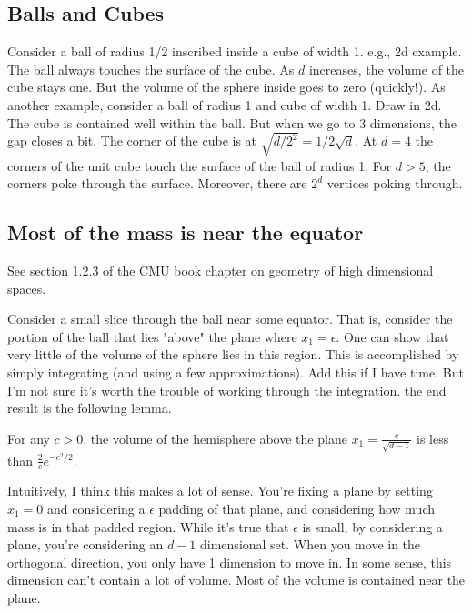 


\subsection{Balls and Cubes}
Consider a ball of radius 1/2 inscribed inside a cube of width 1. e.g., 2d example. The ball always touches the surface of the cube. As $d$ increases, the volume of the cube stays one. But the volume of the sphere inside goes to zero (quickly!). As another example, consider a ball of radius 1 and cube of width 1. Draw in 2d. The cube is contained well within the ball. But when we go to 3 dimensions, the gap closes a bit. The corner of the cube is at $\sqrt{d/2^2} = 1/2\sqrt{d}$. At $d=4$ the corners of the unit cube touch the surface of the ball of radius 1. For $d>5$, the corners poke through the surface. Moreover, there are $2^d$ vertices poking through. 


\subsection{Most of the mass is near the equator}
See section 1.2.3 of the CMU book chapter on geometry of high dimensional spaces. 

Consider a small slice through the ball near some equator. That is, consider the portion of the ball that lies "above" the plane where $x_1 = \epsilon$. One can show that very little of the volume of the sphere lies in this region. This is accomplished by simply integrating (and using a few approximations). Add this if I have time. But I'm not sure it's worth the trouble of working through the integration. the end result is the following lemma. 
\begin{lemma}
For any $c>0$, the volume of the hemisphere above the plane $x_1 = \frac{c}{\sqrt{d-1}}$ is less than $\frac{2}{c}e^{-c^2/2}$. 
\end{lemma}
Intuitively, I think this makes a lot of sense. You're fixing a plane by setting $x_1=0$ and considering a $\epsilon$ padding of that plane, and considering how much mass is in that padded region. While it's true that $\epsilon$ is small, by considering a plane, you're considering an $d-1$ dimensional set. When you move in the orthogonal direction, you only have 1 dimension to move in. In some sense, this dimension can't contain a lot of volume. Most of the volume is contained near the plane. 

